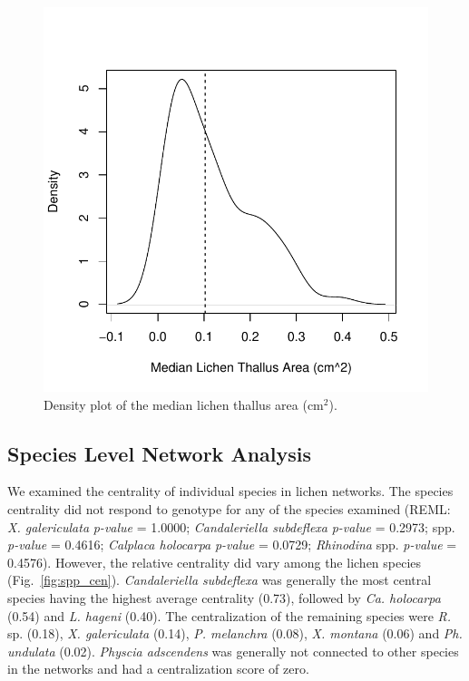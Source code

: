 \documentclass[11pt,onecolumn,lineno]{pnas-new}
\begin{document}
\begin{figure}[ht]
\centering
\includegraphics[width=\linewidth]{supplement/xg_size.pdf}
\caption{Density plot of the median lichen thallus area (cm$^2$). }
\label{fig:SI_xg_median}
\end{figure}




\subsection{Species Level Network Analysis}


We examined the centrality of individual species in lichen
networks. The species centrality did not respond to genotype for any
of the species examined (REML: \textit{X. galericulata}
\textit{p-value} = 1.0000; \textit{Candaleriella subdeflexa}
\textit{p-value} = 0.2973;  spp. \textit{p-value} =
0.4616; \textit{Calplaca holocarpa} \textit{p-value} = 0.0729;
\textit{Rhinodina} spp. \textit{p-value} = 0.4576). However, the
relative centrality did vary among the lichen species
(Fig.~\ref{fig:spp_cen}). \textit{Candaleriella subdeflexa} was
generally the most central species having the highest average
centrality (0.73), followed by \textit{Ca. holocarpa} (0.54) and
\textit{L. hageni} (0.40). The centralization of the remaining species
were \textit{R.}  sp. (0.18), \textit{X. galericulata} (0.14),
\textit{P. melanchra} (0.08), \textit{X. montana} (0.06) and
\textit{Ph. undulata} (0.02). \textit{Physcia adscendens} was
generally not connected to other species in the networks and had a
centralization score of zero.
\end{document}
